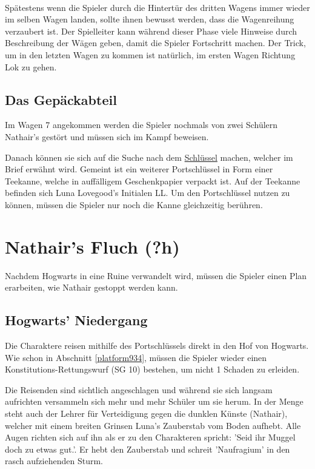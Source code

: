 \documentclass[]{scrartcl}
\begin{document}
~\\

Spätestens wenn die Spieler durch die Hintertür des dritten Wagens immer wieder im selben Wagen landen, sollte ihnen bewusst werden, dass die Wagenreihung verzaubert ist. Der Spielleiter kann während dieser Phase viele Hinweise durch Beschreibung der Wägen geben, damit die Spieler Fortschritt machen. Der Trick, um in den letzten Wagen zu kommen ist natürlich, im ersten Wagen Richtung Lok zu gehen.

\subsection{Das Gepäckabteil}

Im Wagen 7 angekommen werden die Spieler nochmals von zwei Schülern Nathair's gestört und müssen sich im Kampf beweisen.


Danach können sie sich auf die Suche nach dem \underline{Schlüssel} machen, welcher im Brief erwähnt wird. Gemeint ist ein weiterer Portschlüssel in Form einer Teekanne, welche in auffälligem Geschenkpapier verpackt ist. Auf der Teekanne befinden sich Luna Lovegood's Initialen {\calligra LL}. Um den Portschlüssel nutzen zu können, müssen die Spieler nur noch die Kanne gleichzeitig berühren.

\section{Nathair's Fluch (?h)}

Nachdem Hogwarts in eine Ruine verwandelt wird, müssen die Spieler einen Plan erarbeiten, wie Nathair gestoppt werden kann.

\subsection{Hogwarts' Niedergang}

Die Charaktere reisen mithilfe des Portschlüssels direkt in den Hof von Hogwarts. Wie schon in Abschnitt \ref{platform934}, müssen die Spieler wieder einen Konstitutions-Rettungswurf (SG 10) bestehen, um nicht 1 Schaden zu erleiden.

Die Reisenden sind sichtlich angeschlagen und während sie sich langsam aufrichten versammeln sich mehr und mehr Schüler um sie herum. In der Menge steht auch der Lehrer für Verteidigung gegen die dunklen Künste (Nathair), welcher mit einem breiten Grinsen Luna's Zauberstab vom Boden aufhebt. Alle Augen richten sich auf ihn als er zu den Charakteren spricht: 'Seid ihr Muggel doch zu etwas gut.'. Er hebt den Zauberstab und schreit 'Naufragium' in den rasch aufziehenden Sturm.
\end{document}
